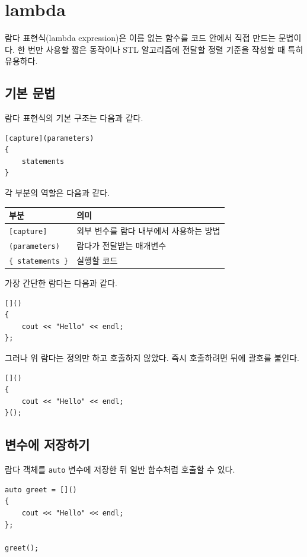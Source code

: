 \documentclass[11pt,a4paper]{article}
\begin{document}
\section{lambda}
람다 표현식(lambda expression)은 이름 없는 함수를 코드 안에서 직접 만드는 문법이다. 한 번만 사용할 짧은 동작이나 STL 알고리즘에 전달할 정렬 기준을 작성할 때 특히 유용하다.

\subsection{기본 문법}
람다 표현식의 기본 구조는 다음과 같다.

\begin{lstlisting}
[capture](parameters)
{
    statements
}
\end{lstlisting}

각 부분의 역할은 다음과 같다.

\begin{center}
\begin{tabular}{ll}
\toprule
부분 & 의미 \\
\midrule
\texttt{[capture]} & 외부 변수를 람다 내부에서 사용하는 방법 \\
\texttt{(parameters)} & 람다가 전달받는 매개변수 \\
\texttt{\{ statements \}} & 실행할 코드 \\
\bottomrule
\end{tabular}
\end{center}

가장 간단한 람다는 다음과 같다.

\begin{lstlisting}
[]()
{
    cout << "Hello" << endl;
};
\end{lstlisting}

그러나 위 람다는 정의만 하고 호출하지 않았다. 즉시 호출하려면 뒤에 괄호를 붙인다.

\begin{lstlisting}
[]()
{
    cout << "Hello" << endl;
}();
\end{lstlisting}

\subsection{변수에 저장하기}
람다 객체를 \texttt{auto} 변수에 저장한 뒤 일반 함수처럼 호출할 수 있다.

\begin{lstlisting}
auto greet = []()
{
    cout << "Hello" << endl;
};

greet();
\end{lstlisting}
\end{document}
